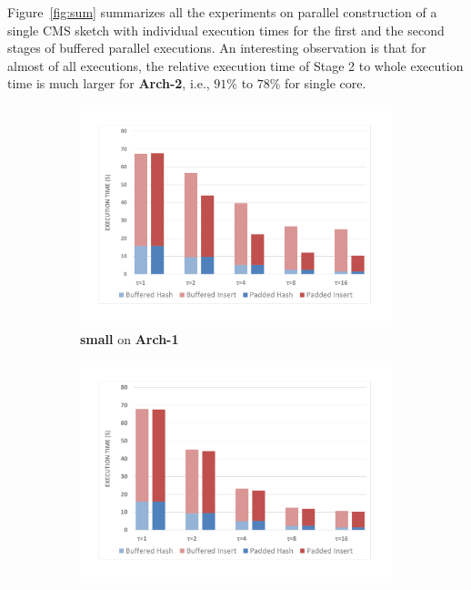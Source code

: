 \documentclass[10pt, conference, compsocconf]{IEEEtran}
\begin{document}
Figure~\ref{fig:sum} summarizes all the experiments on parallel construction of a single CMS sketch with individual execution times for the first and the second stages of buffered parallel executions. An interesting observation is that for almost of all executions, the relative execution time of Stage 2 to whole execution time is much larger for \textbf{Arch-2}, i.e., $91\%$ to $78\%$ for single core. 

\begin{figure}[htbp]
\begin{subfigure}[t]{0.45\textwidth}
\includegraphics[width=\linewidth]{expfigs/8x211gandalf.pdf}
\caption{{\bf small} on {\bf Arch-1}}
\label{fig:8x211arch1}
\end{subfigure}
\begin{subfigure}[t]{0.45\textwidth}\hspace*{-10ex}
\includegraphics[width=\linewidth]{expfigs/8x2003gandalf.pdf}

\end{subfigure}
\end{figure}
\end{document}
